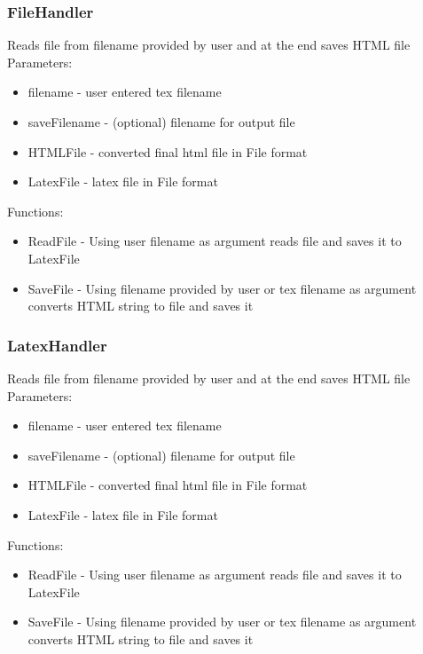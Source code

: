 \subsubsection{FileHandler}
Reads file from filename provided by user and at the end saves HTML file \\ 
Parameters: \\ 
\begin{itemize}
\item filename - user entered tex filename
\item saveFilename - (optional) filename for output file 
\item HTMLFile - converted final html file in File format 
\item LatexFile - latex file in File format 
\end{itemize}
Functions: 
\begin{itemize}
    \item ReadFile - Using user filename as argument reads file and saves it to LatexFile
    \item SaveFile - Using filename provided by user or tex filename as argument converts HTML string to file and saves it 
\end{itemize}

\subsubsection{LatexHandler}
Reads file from filename provided by user and at the end saves HTML file \\ 
Parameters: \\ 
\begin{itemize}
\item filename - user entered tex filename
\item saveFilename - (optional) filename for output file 
\item HTMLFile - converted final html file in File format 
\item LatexFile - latex file in File format 
\end{itemize}
Functions: 
\begin{itemize}
    \item ReadFile - Using user filename as argument reads file and saves it to LatexFile
    \item SaveFile - Using filename provided by user or tex filename as argument converts HTML string to file and saves it 
\end{itemize}

